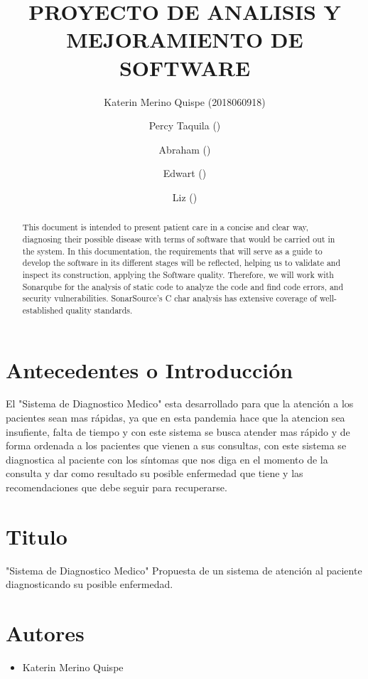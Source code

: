 \documentclass[preprint,12pt]{elsarticle}
\begin{document}
	
	\begin{frontmatter}

		\title{\huge  PROYECTO DE  ANALISIS Y  MEJORAMIENTO DE  SOFTWARE }
		\author{Katerin Merino Quispe              (2018060918)}
		\author{Percy Taquila                ()}
		\author{Abraham                ()}
		\author{Edwart                ()}
		\author{Liz                ()}
		\address{Tacna, Perú}
		


\begin{abstract}
This document is intended to present patient care in a concise and clear way, diagnosing their possible disease with terms of software that would be carried out in the system. In this documentation, the requirements that will serve as a guide to develop the software in its different stages will be reflected, helping us to validate and inspect its construction, applying the Software quality.
Therefore, we will work with Sonarqube for the analysis of static code to analyze the code and find code errors, and security vulnerabilities. SonarSource's C char analysis has extensive coverage of well-established quality standards.  
\end{abstract}


\end{frontmatter}
\section{Antecedentes o Introducción}

El "Sistema de Diagnostico Medico" esta desarrollado para que la atención a los pacientes sean mas rápidas, ya que en esta pandemia hace que la atencion sea insufiente, falta de tiempo y con este sistema se busca atender mas rápido y de forma ordenada a los pacientes que vienen a sus consultas, con este sistema se diagnostica al paciente con los síntomas que nos diga en el momento de la consulta y dar como resultado su posible enfermedad que tiene y las recomendaciones que debe seguir para recuperarse.

\section{Titulo}
"Sistema de Diagnostico Medico"
Propuesta de un sistema de atención al paciente diagnosticando su posible enfermedad.
\section{Autores}
\begin{itemize}
    \item Katerin Merino Quispe
    
\end{itemize}
\end{document}
